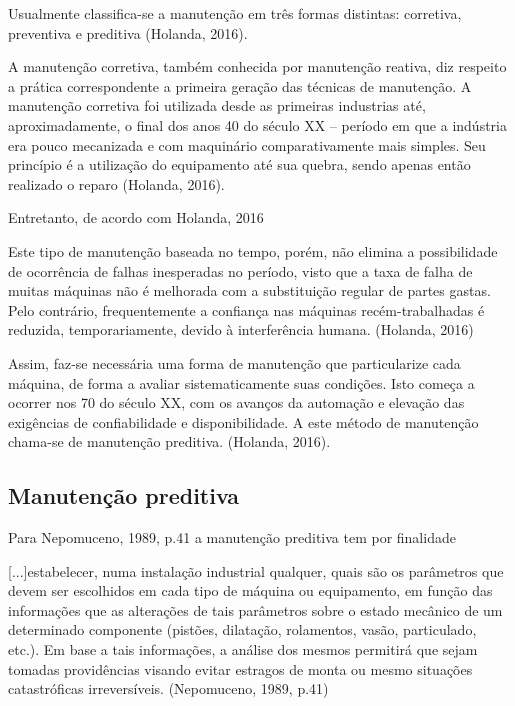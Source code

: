 \documentclass[
	12pt,				
	oneside,			
	a4paper,			
	english,			
	brazil				
	]{abntex2ppgsi}
\begin{document}
	Usualmente classifica-se a manutenção em três formas distintas: corretiva, preventiva e preditiva (Holanda, 2016). 

	A manutenção corretiva, também conhecida por manutenção reativa, diz respeito a prática correspondente a primeira geração das técnicas de manutenção. A manutenção corretiva foi utilizada desde as primeiras industrias até, aproximadamente, o final dos anos 40 do século XX – período em que a indústria era pouco mecanizada e com maquinário comparativamente mais simples. Seu princípio é a utilização do equipamento até sua quebra, sendo apenas então realizado o reparo (Holanda, 2016). 
	
Entretanto, de acordo com Holanda, 2016	

\begin{citacao}

	Este tipo de manutenção baseada no tempo, porém, não elimina a possibilidade de ocorrência de falhas inesperadas no período, visto que a taxa de falha de 	muitas máquinas não é melhorada com a substituição regular de partes gastas. Pelo contrário, frequentemente a confiança nas máquinas recém-trabalhadas é 		reduzida, temporariamente, devido à interferência humana. (Holanda, 2016)

\end{citacao}

Assim, faz-se necessária uma forma de manutenção que particularize cada máquina, de forma a avaliar sistematicamente suas condições. Isto começa a ocorrer nos 70 do século XX, com os avanços da automação e elevação das exigências de confiabilidade e disponibilidade. A este método de manutenção chama-se de manutenção preditiva. (Holanda, 2016).  


\subsection{\textbf{Manutenção preditiva}}

Para Nepomuceno, 1989, p.41 a manutenção preditiva tem por finalidade 

\begin{citacao}

[...]estabelecer, numa instalação industrial qualquer, quais são os parâmetros que devem ser escolhidos em cada tipo de máquina ou equipamento, em função das informações que as alterações de tais parâmetros sobre o estado mecânico de um determinado componente (pistões, dilatação, rolamentos, vasão, particulado, etc.). Em base a tais informações, a análise dos mesmos permitirá que sejam tomadas providências visando evitar estragos de monta ou mesmo situações catastróficas irreversíveis. (Nepomuceno, 1989, p.41)

\end{citacao}
\end{document}
